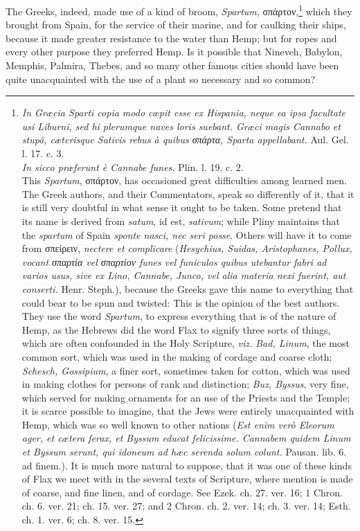 \documentclass[a4paper, 11pt, oneside, polutonikogreek, english]{article}
\begin{document}
The Greeks, indeed, made use of a kind of broom, \emph{Spartum}, σπάρτον,\footnote{\emph{In Græcia Sparti copia modo cœpit esse ex Hispania, neque ea ipsa facultate usi Liburni, sed hi plerumque naves loris suebant. Græci magis Cannabo et stupâ, cæterisque Sativis rebus à quibus σπάρτα, Sparta appellabant.} Aul. Gel. l. 17. c. 3.\\\hspace*{5mm}\emph{In sicco præferunt è Cannabe funes.} Plin. l. 19. c. 2.\\\hspace*{5mm}This \emph{Spartum}, σπάρτον, has occasioned great difficulties among learned men. The Greek authors, and their Commentators, speak so differently of it, that it is still very doubtful in what sense it ought to be taken. Some pretend that its name is derived from \emph{satum}, id est, \emph{sativum}; while Pliny maintains that the \emph{spartum} of Spain \emph{sponte nasci, nec seri posse}. Others will have it to come from σπείρειν, \emph{nectere et complicare} (\emph{Hesychius, Suidas, Aristophanes, Pollux, vocant σπαρτία vel σπαρτίον funes vel funiculos quibus utebantur fabri ad varios usus, sive ex Lino, Cannabe, Junco, vel alia materia nexi fuerint, aut conserti.} Henr. Steph.), because the Greeks gave this name to everything that could bear to be spun and twisted: This is the opinion of the best authors. They use the word \emph{Spartum}, to express everything that is of the nature of Hemp, as the Hebrews did the word Flax to signify three sorts of things, which are often confounded in the Holy Scripture, \emph{viz. Bad, Linum}, the most common sort, which was used in the making of cordage and coarse cloth; \emph{Schesch, Gossipium}, a finer sort, sometimes taken for cotton, which was used in making clothes for persons of rank and distinction; \emph{Buz, Byssus}, very fine, which served for making ornaments for an use of the Priests and the Temple; it is scarce possible to imagine, that the Jews were entirely unacquainted with Hemp, which was so well known to other nations (\emph{Est enim verò Eleorum ager, et cætera ferax, et Byssum educat felicissime. Cannabem quidem Linum et Byssum serunt, qui idoneum ad hæc serenda solum colunt.} Pausan. lib. 6. ad finem.). It is much more natural to suppose, that it was one of these kinds of Flax we meet with in the several texts of Scripture, where mention is made of coarse, and fine linen, and of cordage. See Ezek. ch. 27. ver. 16; 1 Chron. ch. 6. ver. 21; ch. 15. ver. 27; and 2 Chron. ch. 2. ver. 14; ch. 3. ver. 14; Esth. ch. 1. ver. 6; ch. 8. ver. 15.} which they brought from Spain, for the service of their marine, and for caulking their ships, because it made greater resistance to the water than Hemp; but for ropes and every other purpose they preferred Hemp. Is it possible that Nineveh, Babylon, Memphis, Palmira, Thebes, and so many other famous cities should have been quite unacquainted with the use of a plant so necessary and so common?
\end{document}
